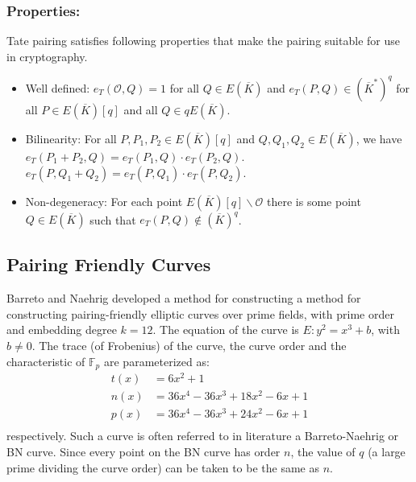 \subsubsection{Properties:}
Tate pairing satisfies following properties that make the pairing suitable for use in cryptography.
\begin{itemize}
 \item Well defined:  $e_T(\mathcal{O},Q) =  1$ for all $Q \in E(\overline{K})$ and $e_T(P,Q) \in (\overline{K}^*)^q$ for all $P \in E(\overline{K})[q]$ and all $Q \in qE(\overline{K})$.
 \item Bilinearity: For all $P, P_1, P_2 \in E(\overline{K})[q]$ and $Q, Q_1, Q_2 \in E(\overline{K})$, we have
 \subitem $e_T(P_1+P_2,Q) = e_T(P_1,Q) \cdot e_T(P_2,Q)$.
 \subitem $e_T(P,Q_1+Q_2) = e_T(P,Q_1) \cdot e_T(P,Q_2)$.
 \item Non-degeneracy: For each point $E(\overline{K})[q] \backslash {\mathcal{O}}$ there is some point $Q \in E(\overline{K})$ such that $e_T(P,Q) \notin (\overline{K})^q$.
\end{itemize}

\subsection{Pairing Friendly Curves}

Barreto and Naehrig \cite{barreto2006pairing} developed a method for constructing a method for constructing pairing-friendly elliptic curves over prime fields, with prime order and embedding degree $k = 12$. The equation of the curve is $E : y^2 = x^3 + b$, with $b \neq 0$. The trace (of Frobenius) of the curve, the curve order and the characteristic of $\mathbb{F}_p$  are parameterized as:
\begin{align*}
t(x) &= 6x^2 + 1\\
n(x) &= 36x^4-36x^3+18x^2-6x+1\\
p(x) &= 36x^4-36x^3+24x^2-6x+1\\
\end{align*}
respectively. Such a curve is often referred to in literature a Barreto-Naehrig or BN curve. Since every point on the BN curve has order $n$, the value of $q$ (a large prime dividing the curve order) can be taken to be the same as $n$.

